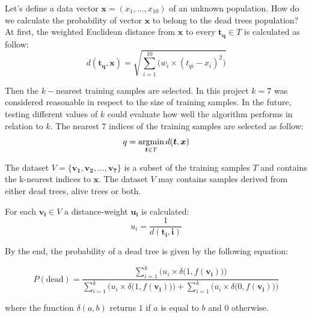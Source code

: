\documentclass{subfiles}
\begin{document}
\par Let's define a data vector $\boldsymbol{x}=(x_1,\dots,x_{10})$ of an unknown population. How do we calculate the probability of vector $\boldsymbol{x}$ to belong to the dead trees population? At first, the weighted Euclidean distance from $\boldsymbol{x}$ to every $\boldsymbol{t_q} \in T$ is calculated as follow:
\begin{equation} 
d(\boldsymbol{t_q},\boldsymbol{x}) = \sqrt{\sum_{i=1}^{10}{ \Big(w_i \times (t_{qi}-x_i)^2 \Big)}}
\end{equation}


\par Then the $k-$nearest training samples are selected. In this project $k=7$ was considered reasonable in respect to the size of training samples. In the future, testing different values of $k$ could evaluate how well the algorithm performs in relation to $k$. The nearest $7$ indices of the training samples are selected as follow:
\begin{equation} 
q = \operatornamewithlimits{argmin}_{\boldsymbol{t} \in T} d(\boldsymbol{t},\boldsymbol{x})
\end{equation}
\par The dataset $V=\{\boldsymbol{v_1}, \boldsymbol{v_2},\dots, \boldsymbol{v_7}\} $ is a subset of the training samples $T$ and contains the k-nearest indices to $\boldsymbol{x}$. The dataset $V$ may contains samples derived from either dead trees, alive trees or both. 


\par For each $\boldsymbol{v_i} \in V$ a distance-weight $\boldsymbol{u_i}$ is calculated:
\begin{equation} 
u_i = \frac{1}{d(\boldsymbol{t_i}, \boldsymbol{i})}
\end{equation}

\par By the end, the probability of a dead tree is given by the following equation: 

\begin{equation} 
P(\textrm{dead}) =  \frac{\sum_{i=1}^{k}{ \Big(u_i \times \delta \big(1,f(\boldsymbol{v_i})\big)\Big)}}{ \sum_{i=1}^{k}{\Big(u_i \times \delta \big(1,f(\boldsymbol{v_i})\big)\Big)} + \sum_{i=1}^{k}{ \Big(u_i \times \delta \big(0,f(\boldsymbol{v_i})\big)\Big)}}
\end{equation}

{\setlength{\parindent}{0cm}
 where the function $\delta(a,b)$ returns $1$ if $a$ is equal to $b$ and $0$ otherwise. 
}
\end{document}
